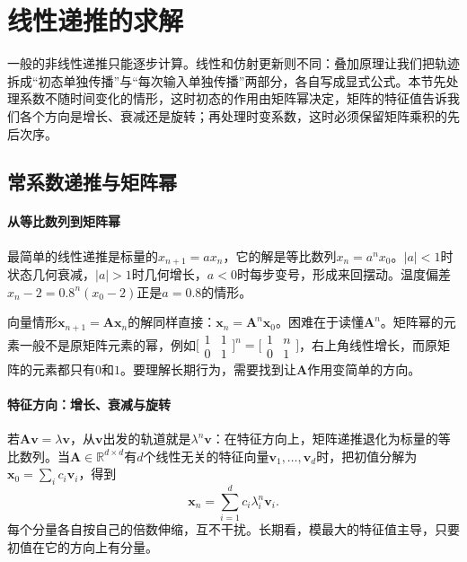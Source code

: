 
\section{线性递推的求解}
\label{sec:dds-linear-recurrences}

一般的非线性递推只能逐步计算。线性和仿射更新则不同：叠加原理让我们把轨迹拆成“初态单独传播”与“每次输入单独传播”两部分，各自写成显式公式。本节先处理系数不随时间变化的情形，这时初态的作用由矩阵幂决定，矩阵的特征值告诉我们各个方向是增长、衰减还是旋转；再处理时变系数，这时必须保留矩阵乘积的先后次序。

\subsection{常系数递推与矩阵幂}
\label{sec:dds-constant-coefficient}

\paragraph{从等比数列到矩阵幂}
最简单的线性递推是标量的$x_{n+1}=ax_n$，它的解是等比数列$x_n=a^nx_0$。$|a|<1$时状态几何衰减，$|a|>1$时几何增长，$a<0$时每步变号，形成来回摆动。温度偏差$x_n-2=0.8^n(x_0-2)$正是$a=0.8$的情形。

向量情形$\bm x_{n+1}=\bm A\bm x_n$的解同样直接：$\bm x_n=\bm A^n\bm x_0$。困难在于读懂$\bm A^n$。矩阵幂的元素一般不是原矩阵元素的幂，例如$\bigl[\begin{smallmatrix}1&1\\0&1\end{smallmatrix}\bigr]^n=\bigl[\begin{smallmatrix}1&n\\0&1\end{smallmatrix}\bigr]$，右上角线性增长，而原矩阵的元素都只有$0$和$1$。要理解长期行为，需要找到让$\bm A$作用变简单的方向。

\paragraph{特征方向：增长、衰减与旋转}
若$\bm A\bm v=\lambda\bm v$，从$\bm v$出发的轨道就是$\lambda^n\bm v$：在特征方向上，矩阵递推退化为标量的等比数列。当$\bm A\in\mathbb R^{d\times d}$有$d$个线性无关的特征向量$\bm v_1,\ldots,\bm v_d$时，把初值分解为$\bm x_0=\sum_ic_i\bm v_i$，得到
\begin{equation}
  \bm x_n=\sum_{i=1}^dc_i\lambda_i^n\bm v_i .
  \label{eq:dds-modal-solution}
\end{equation}
每个分量各自按自己的倍数伸缩，互不干扰。长期看，模最大的特征值主导，只要初值在它的方向上有分量。

